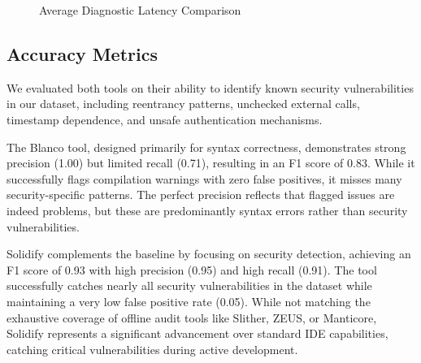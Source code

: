 \documentclass[10pt, a4paper]{article}
\begin{document}
\begin{figure}[H]
    \centering
    \caption{Average Diagnostic Latency Comparison}
    \label{fig:latency_comparison}
\end{figure}

\subsection{Accuracy Metrics}

We evaluated both tools on their ability to identify known security vulnerabilities in our dataset, including reentrancy patterns, unchecked external calls, timestamp dependence, and unsafe authentication mechanisms.

The Blanco tool, designed primarily for syntax correctness, demonstrates strong precision (1.00) but limited recall (0.71), resulting in an F1 score of 0.83. While it successfully flags compilation warnings with zero false positives, it misses many security-specific patterns. The perfect precision reflects that flagged issues are indeed problems, but these are predominantly syntax errors rather than security vulnerabilities.

Solidify complements the baseline by focusing on security detection, achieving an F1 score of 0.93 with high precision (0.95) and high recall (0.91). The tool successfully catches nearly all security vulnerabilities in the dataset while maintaining a very low false positive rate (0.05). While not matching the exhaustive coverage of offline audit tools like Slither, ZEUS, or Manticore, Solidify represents a significant advancement over standard IDE capabilities, catching critical vulnerabilities during active development.
\end{document}
